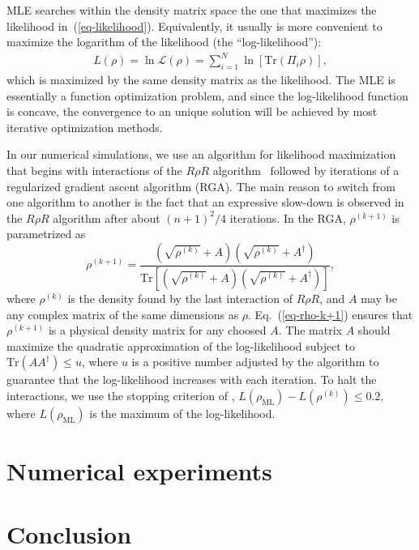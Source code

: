 \documentclass[
reprint,
superscriptaddress,
showpacs,
amsmath,
amssymb,
aps,
pra,
longbibliography
]{revtex4-1}
\begin{document}
MLE searches within the density matrix space the one that maximizes the likelihood in~(\ref{eq-likelihood}). Equivalently, it usually is more convenient to maximize the logarithm of the likelihood (the ``log-likelihood''):
\begin{eqnarray}
L (\rho) = \ln \mathcal{L} (\rho)= \sum_{i=1}^{N} \ln [\mathrm{Tr} (\Pi_i \rho)],
\end{eqnarray} 
which is maximized by the same density matrix as the likelihood. The MLE is essentially a function optimization problem, and since the log-likelihood function is concave, the convergence to an unique solution will be achieved by most iterative optimization methods.

In our numerical simulations, we use an algorithm for likelihood maximization that begins with interactions of the $R\rho R$ algorithm~\cite{Rehacek2007} followed by iterations of a regularized gradient ascent algorithm (RGA). The main reason to switch from one algorithm to another is the fact that an expressive slow-down is observed in the $R\rho R$ algorithm after about $(n+1)^2/4$ iterations. In the RGA, $\rho^{(k+1)}$ is parametrized as 
\begin{equation}
  \rho^{(k+1)}=\frac{\left(\sqrt{\rho^{(k)}}+A\right)\left(\sqrt{\rho^{(k)}}+A^{\dagger}\right)}{\mathrm{Tr}\left[\left(\sqrt{\rho^{(k)}}+A\right)\left(\sqrt{\rho^{(k)}}+A^{\dagger}\right)\right]},
\label{eq-rho-k+1}
\end{equation}
where $\rho^{(k)}$ is the density found by the last interaction of $R \rho R$, and $A$ may be any complex matrix of the same dimensions as $\rho$. Eq.~(\ref{eq-rho-k+1}) ensures that $\rho^{(k+1)}$ is a physical density matrix for any choosed $A$. The matrix $A$ should maximize the quadratic
approximation of the log-likelihood subject to $\text{Tr}(AA^{\dagger})\leq u$, where $u$ is a positive number adjusted by the algorithm to guarantee that the log-likelihood increases with
each iteration. To halt the interactions, we use the stopping criterion of \cite{Glancy2012}, $L(\rho_{\text{ML}})-L(\rho^{(k)})\leq 0.2$, where $L(\rho_{\text{ML}})$ is the maximum of the log-likelihood.


\section{Numerical experiments}
\label{numerical-experiments}

\section{Conclusion}
\label{conclusion}
\end{document}
